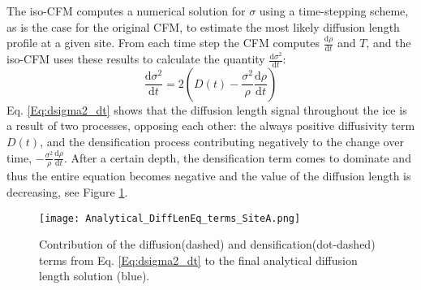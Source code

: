 \documentclass[../../CompleteThesis2/Complete_2ndDraft]{subfiles}
\begin{document}
The iso-CFM computes a numerical solution for $\sigma$ using a time-stepping scheme, as is the case for the original CFM, to estimate the most likely diffusion length profile at a given site. From each time step the CFM computes $\frac{\text{d}\rho}{\text{d}t}$ and $T$, and the iso-CFM uses these results to calculate the quantity $\frac{\text{d}\sigma^2}{\text{d}t}$:
\begin{equation}
	\frac{\text{d}\sigma^2}{\text{d}t} = 2\left(D(t) - \frac{\sigma^2}{\rho}\frac{\text{d}\rho}{\text{d}t}\right)
	\label{Eq:dsigma2_dt}
\end{equation}
Eq. \ref{Eq:dsigma2_dt} shows that the diffusion length signal throughout the ice is a result of two processes, opposing each other: the always positive diffusivity term $D(t)$, and the densification process contributing negatively to the change over time, $-\frac{\sigma^2}{\rho}\frac{\text{d}\rho}{\text{d}t}$. After a certain depth, the densification term comes to dominate and thus the entire equation becomes negative and the value of the diffusion length is decreasing, see Figure \ref{Fig:ICE_DiffDensTerms}.

\begin{figure}
	\centering
	\texttt{[image: Analytical\_DiffLenEq\_terms\_SiteA.png]}
	\caption{Contribution of the diffusion(dashed) and densification(dot-dashed) terms from Eq. \ref{Eq:dsigma2_dt} to the final analytical diffusion length solution (blue).}
	\label{Fig:ICE_DiffDensTerms}
\end{figure}
\end{document}
